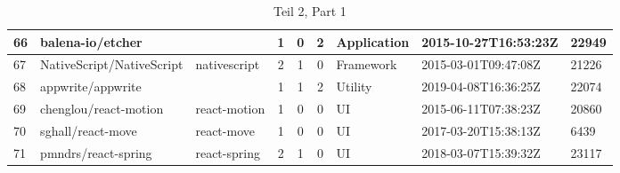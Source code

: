 \begin{landscape}
\begin{table}[]
{\begin{tabular}{lllccclll}
                66 & balena-io/etcher                    &                       & 1                      & 0                 & 2                 & Application       & 2015-10-27T16:53:23Z & 22949          \\ \hline
                67 & NativeScript/NativeScript           & nativescript          & 2                      & 1                 & 0                 & Framework         & 2015-03-01T09:47:08Z & 21226          \\ \hline
                68 & appwrite/appwrite                   &                       & 1                      & 1                 & 2                 & Utility           & 2019-04-08T16:36:25Z & 22074          \\ \hline
                69 & chenglou/react-motion               & react-motion          & 1                      & 0                 & 0                 & UI                & 2015-06-11T07:38:23Z & 20860          \\ \hline
                70 & sghall/react-move                   & react-move            & 1                      & 0                 & 0                 & UI                & 2017-03-20T15:38:13Z & 6439           \\ \hline
                71 & pmndrs/react-spring                 & react-spring          & 2                      & 1                 & 0                 & UI                & 2018-03-07T15:39:32Z & 23117
            \end{tabular}%
        }
        \caption*{Teil 2, Part 1}
    \end{table}
\end{landscape}

